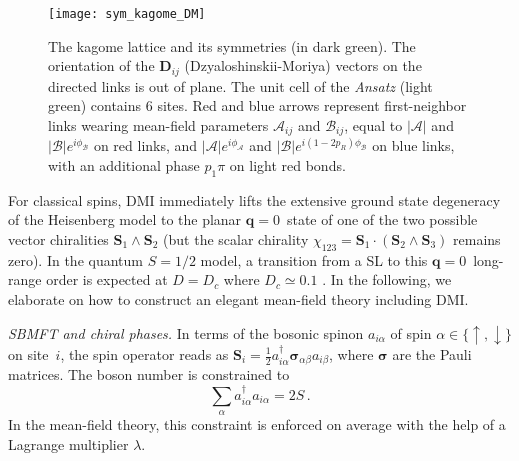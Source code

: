 \documentclass[aps,prl,twocolumn,superscriptaddress,showpacs,a4paper, longbibliography]{revtex4-1}
\newcommand{\qzero}{$\mathbf q=0$}
\begin{document}
\begin{figure}
 \texttt{[image: sym\_kagome\_DM]}
 \caption{
 The kagome lattice and its symmetries (in dark green).
 The orientation of the $\mathbf D_{ij}$ (Dzyaloshinskii-Moriya) vectors on the directed links is out of plane.
 The unit cell of the \textit{Ansatz} (light green) contains 6 sites.
 Red and blue arrows represent first-neighbor links wearing mean-field parameters $\mathcal A_{ij}$ and $\mathcal B_{ij}$,
 equal to $|\mathcal A|$ and $|\mathcal B| e^{i\phi_{\mathcal B}}$ on red links, and
 $|\mathcal A|e^{i\phi_{\mathcal A}}$ and $|\mathcal B| e^{i(1-2p_R)\phi_{\mathcal B}}$ on blue links,
 with an additional phase $p_1\pi$ on light red bonds.
\label{fig:DM_orientation}
}
\end{figure}

For classical spins, DMI immediately lifts the extensive ground state degeneracy of the Heisenberg model to the planar \qzero\ state of one of the two possible vector chiralities $\mathbf S_1 \land \mathbf S_2$ \cite{Elhajal} (but the scalar chirality $\chi_{123} = \mathbf S_1\cdot(\mathbf S_2\land \mathbf S_3)$ remains zero).
In the quantum $S=1/2$ model, a transition from a SL to this \qzero\ long-range order is expected at $D=D_c$ where $D_c\simeq 0.1$ \cite{DM_Cepas, Moi_DM, DM_Fritz}.
In the following, we elaborate on how to construct an elegant mean-field theory including DMI.

{\it SBMFT and chiral phases.}
In terms of the bosonic spinon $a_{i\alpha}$ of spin \mbox{$\alpha\in\{\uparrow,\downarrow\}$} on site~$i$, the spin operator reads as $\mathbf S_i = \frac12 a_{i\alpha}^\dag \bm \sigma_{\alpha\beta}a_{i\beta}$, where $\bm \sigma$ are the Pauli matrices.
The boson number is constrained to
\begin{equation}
  \label{eq:constraint}
  \sum_\alpha a_{i\alpha}^\dag a_{i\alpha} = 2S\,.
\end{equation}
In the mean-field theory, this constraint is enforced on average with the help of a Lagrange multiplier $\lambda$.
\end{document}
